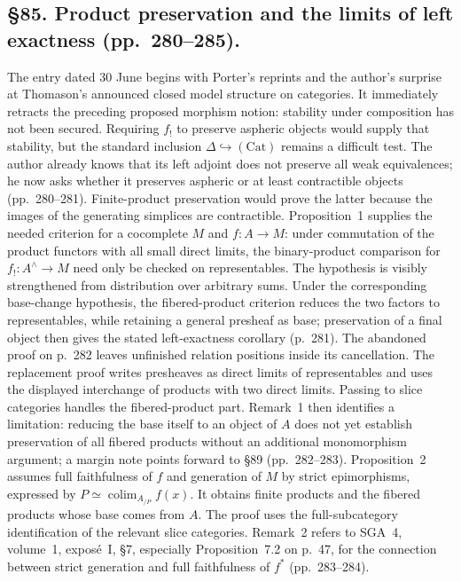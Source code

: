 \documentclass[10pt,oneside]{book}
\begin{document}
\subsection*{\S85. Product preservation and the limits of left exactness (pp.\ 280--285).}
The entry dated 30 June begins with Porter's reprints and the author's surprise at Thomason's announced closed model structure on categories. It immediately retracts the preceding proposed morphism notion: stability under composition has not been secured. Requiring $f_!$ to preserve aspheric objects would supply that stability, but the standard inclusion $\Delta\hookrightarrow(\mathrm{Cat})$ remains a difficult test. The author already knows that its left adjoint does not preserve all weak equivalences; he now asks whether it preserves aspheric or at least contractible objects (pp.\ 280--281). Finite-product preservation would prove the latter because the images of the generating simplices are contractible. Proposition~1 supplies the needed criterion for a cocomplete $M$ and $f:A\to M$: under commutation of the product functors with all small direct limits, the binary-product comparison for $f_!:A^\wedge\to M$ need only be checked on representables. The hypothesis is visibly strengthened from distribution over arbitrary sums. Under the corresponding base-change hypothesis, the fibered-product criterion reduces the two factors to representables, while retaining a general presheaf as base; preservation of a final object then gives the stated left-exactness corollary (p.\ 281).
The abandoned proof on p.\ 282 leaves unfinished relation positions inside its cancellation. The replacement proof writes presheaves as direct limits of representables and uses the displayed interchange of products with two direct limits. Passing to slice categories handles the fibered-product part. Remark~1 then identifies a limitation: reducing the base itself to an object of $A$ does not yet establish preservation of all fibered products without an additional monomorphism argument; a margin note points forward to \S89 (pp.\ 282--283). Proposition~2 assumes full faithfulness of $f$ and generation of $M$ by strict epimorphisms, expressed by $P\simeq\mathop{\mathrm{colim}}_{A_{/P}}f(x)$. It obtains finite products and the fibered products whose base comes from $A$. The proof uses the full-subcategory identification of the relevant slice categories. Remark~2 refers to SGA~4, volume~1, expos\'e~I, \S7, especially Proposition~7.2 on p.\ 47, for the connection between strict generation and full faithfulness of $f^*$ (pp.\ 283--284).
\end{document}
